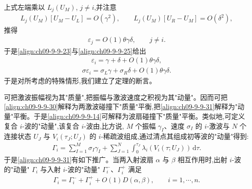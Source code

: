 \documentclass[../../main.tex]{subfiles}
\begin{document}
上式左端乘以 $L_{j}(U_{M})$, $j\neq i$,并注意
\begin{align}
L_{j}(U_{M})[U_{M}-U_{L}]=O(\gamma^{2}),\qquad L_{j}(U_{M})[U_{R}-U_{M}]=O(\delta^{2}),
\label{align:ch09-9-9-28}
\end{align}
推得
\begin{align}
\varepsilon_{j}=O(1)\theta\gamma\delta,\qquad j\neq i.
\label{align:ch09-9-9-29}
\end{align}
于是\eqref{align:ch09-9-9-23}与\eqref{align:ch09-9-9-25}给出
\begin{align}
\varepsilon_{i}=\gamma+\delta+O(1)\theta\gamma\delta,
\label{align:ch09-9-9-30}
\end{align}
\begin{align}
\sigma\varepsilon_{i}=\sigma_{L}\gamma+\sigma_{R}\delta+O(1)\theta\gamma\delta.
\label{align:ch09-9-9-31}
\end{align}
于是对所考虑的特殊情形,我们建立了定理的断言。

可把激波振幅视为其"质量",把振幅与激波速度之积视为其"动量"。因而可把\eqref{align:ch09-9-9-30}解释为两激波碰撞下"质量"平衡,把\eqref{align:ch09-9-9-31}解释为"动量"平衡。于是\eqref{align:ch09-9-9-14}可解释为波扇碰撞下"质量"平衡。类似地,可定义复合 $i$-波的"动量",该复合 $i$-波由,比方说, $M$ 个振幅 $\gamma_{I}$、速度 $\sigma_{I}$ 的 $i$-激波与 $N$ 个连接状态 $U_{J}$ 与 $V_{i}(\tau_{J};U_{J})$ 的 $i$-稀疏波组成,通过清点其组成初等波的"动量"得到:
\begin{align}
\Gamma_{i}=\sum_{I=1}^{M}\sigma_{I}\gamma_{I}+\sum_{J=1}^{N}\int_{0}^{\tau_{J}}\lambda_{i}(V_{i}(\tau;U_{J}))\,\mathrm{d}\tau.
\label{align:ch09-9-9-32}
\end{align}
于是\eqref{align:ch09-9-9-31}有如下推广。当两入射波扇 $\alpha$ 与 $\beta$ 相互作用时,出射 $i$-波的"动量" $\Gamma_{i}$ 与入射 $i$-波的"动量" $\Gamma_{i}^{-}$、$\Gamma_{i}^{+}$ 满足
\begin{align}
\Gamma_{i}=\Gamma_{i}^{-}+\Gamma_{i}^{+}+O(1)D(\alpha,\beta),\qquad i=1,\cdots ,n.
\label{align:ch09-9-9-33}
\end{align}
\end{document}
